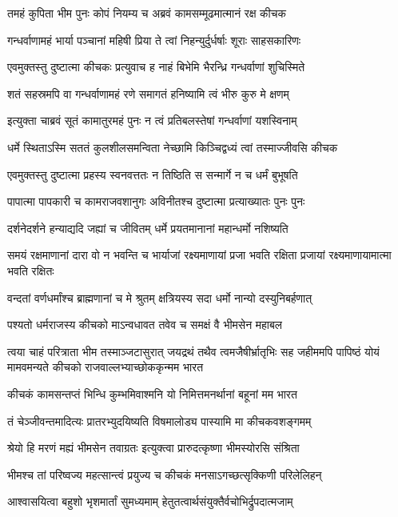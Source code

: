 \twolineshloka
{तमहं कुपिता भीम पुनः कोपं नियम्य च}
{अब्रवं कामसम्मूढमात्मानं रक्ष कीचक}


\twolineshloka
{गन्धर्वाणामहं भार्या पञ्चानां महिषी प्रिया}
{ते त्वां निहन्युर्दुर्धर्षाः शूराः साहसकारिणः}


\twolineshloka
{एवमुक्तस्तु दुष्टात्मा कीचकः प्रत्युवाच ह}
{नाहं बिभेमि भैरन्ध्रि गन्धर्वाणां शुचिस्मिते}


\twolineshloka
{शतं सहस्रमपि वा गन्धर्वाणामहं रणे}
{समागतं हनिष्यामि त्वं भीरु कुरु मे क्षणम्}


\twolineshloka
{इत्युक्ता चाब्रवं सूतं कामातुरमहं पुनः}
{न त्वं प्रतिबलस्तेषां गन्धर्वाणां यशस्विनाम्}


\twolineshloka
{धर्मे स्थिताऽस्मि सततं कुलशीलसमन्विता}
{नेच्छामि किञ्चिद्वध्यं त्वां तस्माज्जीवसि कीचक}


\twolineshloka
{एवमुक्तस्तु दुष्टात्मा प्रहस्य स्वनवत्ततः}
{न तिष्ठिति स सन्मार्गे न च धर्मं बुभूषति}


\twolineshloka
{पापात्मा पापकारी च कामराजवशानुगः}
{अविनीतश्च दुष्टात्मा प्रत्याख्यातः पुनः पुनः}


\twolineshloka
{दर्शनेदर्शने हन्याद्यदि जह्यां च जीवितम्}
{धर्मे प्रयतमानानां महान्धर्मो नशिष्यति}


\threelineshloka
{समयं रक्षमाणानां दारा वो न भवन्ति च}
{भार्याजां रक्ष्यमाणायां प्रजा भवति रक्षिता}
{प्रजायां रक्ष्यमाणायामात्मा भवति रक्षितः}


\twolineshloka
{वन्दतां वर्णधर्मांश्च ब्राह्मणानां च मे श्रुतम्}
{क्षत्रियस्य सदा धर्मो नान्यो दस्युनिबर्हणात्}


\twolineshloka
{पश्यतो धर्मराजस्य कीचको माऽन्वधावत}
{तवेव च समक्षं वै भीमसेन महाबल}


\onelineshloka
{त्वया चाहं परित्राता भीम तस्माञ्जटासुरात्}
\threelineshloka
{जयद्रथं तथैव त्वमजैषीर्भ्रातृभिः सह}
{जहीममपि पापिष्ठं योयं मामवमन्यते}
{कीचको राजवाल्लभ्याच्छोककृन्मम भारत}


\twolineshloka
{कीचकं कामसन्तप्तं भिन्धि कुम्भमिवाश्मनि}
{यो निमित्तमनर्थानां बहूनां मम भारत}


\twolineshloka
{तं चेञ्जीवन्तमादित्यः प्रातरभ्युदयिष्यति}
{विषमालोड्य पास्यामि मा कीचकवशङ्गमम्}


\twolineshloka
{श्रेयो हि मरणं मह्यं भीमसेन तवाग्रतः}
{इत्युक्त्वा प्रारुदत्कृष्णा भीमस्योरसि संश्रिता}


\twolineshloka
{भीमश्च तां परिष्वज्य महत्सान्त्वं प्रयुज्य च}
{कीचकं मनसाऽगच्छत्सृक्किणी परिलेलिहन्}


\twolineshloka
{आश्वासयित्वा बहुशो भृशमार्तां सुमध्यमाम्}
{हेतुतत्वार्थसंयुक्तैर्वचोभिर्द्रुपदात्मजाम्}



